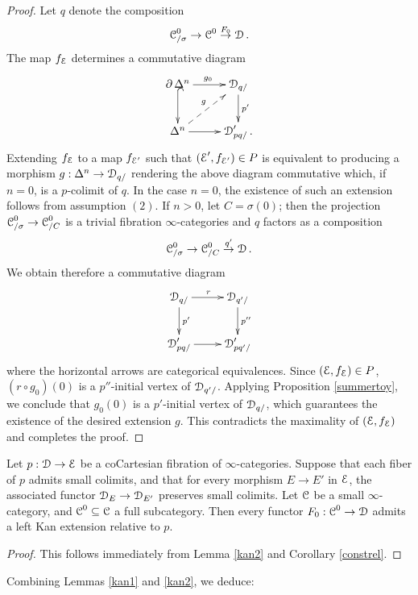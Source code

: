 \begin{proof}
Let $q$ denote the composition
$$ \operatorname{\mathcal{C}}^{0}_{/\sigma} \rightarrow \operatorname{\mathcal{C}}^{0} \stackrel{F_0}{\rightarrow} \operatorname{\mathcal{D}}.$$
The map $f_{\operatorname{\mathcal{E}}}$ determines a commutative diagram
$$ \xymatrix{ \bd \Delta^n \ar@{^{(}->}[d] \ar[r]^{g_0} & \calD_{q/} \ar[d]^{p'} \\
\Delta^n \ar[r] \ar@{-->}[ur]^{g} & \calD'_{p  q/}. }$$
Extending $f_{\operatorname{\mathcal{E}}}$ to a map $f_{\operatorname{\mathcal{E}}'}$ such that $(\operatorname{\mathcal{E}}', f_{\operatorname{\mathcal{E}}'}) \in P$ is
equivalent to producing a morphism $g: \Delta^n \rightarrow \operatorname{\mathcal{D}}_{q/}$ rendering the above
diagram commutative which, if $n=0$, is a $p$-colimit of $q$. In the case
$n=0$, the existence of such an extension follows from assumption $(2)$.
If $n > 0$, let $C = \sigma(0)$; then the projection $\operatorname{\mathcal{C}}^{0}_{/\sigma} \rightarrow
\operatorname{\mathcal{C}}^{0}_{/C}$ is a trivial fibration $\infty$-categories and $q$ factors as a composition
$$ \operatorname{\mathcal{C}}^{0}_{/\sigma} \rightarrow \operatorname{\mathcal{C}}^{0}_{/C} \stackrel{q'}{\rightarrow} \operatorname{\mathcal{D}}.$$ 
We obtain therefore a commutative diagram
$$ \xymatrix{ \calD_{q/} \ar[r]^{r} \ar[d]^{p'} & \calD_{q'/} \ar[d]^{p''} \\
\calD'_{p  q/} \ar[r] & \calD'_{p  q'/} }$$
where the horizontal arrows are categorical equivalences.
Since $(\operatorname{\mathcal{E}}, f_{\operatorname{\mathcal{E}}}) \in P$, $(r \circ g_0)(0)$ is a $p''$-initial vertex of
$\operatorname{\mathcal{D}}_{q'/}$. Applying Proposition \ref{summertoy}, we conclude that $g_0(0)$ is a $p'$-initial
vertex of $\operatorname{\mathcal{D}}_{q/}$, which guarantees the existence of the desired extension $g$.
This contradicts the maximality of $(\operatorname{\mathcal{E}}, f_{\operatorname{\mathcal{E}}})$ and completes the proof.
\end{proof}

\begin{corollary}\label{kanexistleft}
Let $p: \operatorname{\mathcal{D}} \rightarrow \operatorname{\mathcal{E}}$ be a coCartesian fibration of $\infty$-categories. Suppose
that each fiber of $p$ admits small colimits, and that for every morphism
$E \rightarrow E'$ in $\operatorname{\mathcal{E}}$, the associated functor $\operatorname{\mathcal{D}}_{E} \rightarrow \operatorname{\mathcal{D}}_{E'}$
preserves small colimits. Let $\operatorname{\mathcal{C}}$ be a small $\infty$-category, and 
$\operatorname{\mathcal{C}}^{0} \subseteq \operatorname{\mathcal{C}}$ a full subcategory. Then every functor
$F_0: \operatorname{\mathcal{C}}^{0} \rightarrow \operatorname{\mathcal{D}}$ admits a left Kan extension relative
to $p$.
\end{corollary}

\begin{proof}
This follows immediately from Lemma \ref{kan2} and Corollary \ref{constrel}.
\end{proof}

Combining Lemmas \ref{kan1} and \ref{kan2}, we deduce:

